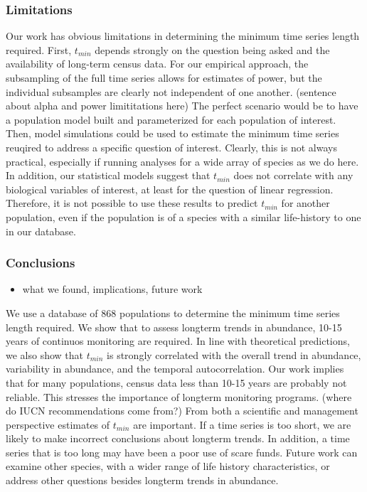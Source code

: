 \documentclass[12pt,]{article}
\providecommand{\tightlist}{%
  \setlength{\itemsep}{0pt}\setlength{\parskip}{0pt}}
\begin{document}
\subsubsection{Limitations}\label{limitations}

Our work has obvious limitations in determining the minimum time series
length required. First, \(t_{min}\) depends strongly on the question
being asked and the availability of long-term census data. For our
empirical approach, the subsampling of the full time series allows for
estimates of power, but the individual subsamples are clearly not
independent of one another. (sentence about alpha and power
limititations here) The perfect scenario would be to have a population
model built and parameterized for each population of interest. Then,
model simulations could be used to estimate the minimum time series
reuqired to address a specific question of interest. Clearly, this is
not always practical, especially if running analyses for a wide array of
species as we do here. In addition, our statistical models suggest that
\(t_{min}\) does not correlate with any biological variables of
interest, at least for the question of linear regression. Therefore, it
is not possible to use these results to predict \(t_{min}\) for another
population, even if the population is of a species with a similar
life-history to one in our database.

\subsubsection{Conclusions}\label{conclusions}

\begin{itemize}
\tightlist
\item
  what we found, implications, future work
\end{itemize}

We use a database of 868 populations to determine the minimum time
series length required. We show that to assess longterm trends in
abundance, 10-15 years of continuos monitoring are required. In line
with theoretical predictions, we also show that \(t_{min}\) is strongly
correlated with the overall trend in abundance, variability in
abundance, and the temporal autocorrelation. Our work implies that for
many populations, census data less than 10-15 years are probably not
reliable. This stresses the importance of longterm monitoring programs.
(where do IUCN recommendations come from?) From both a scientific and
management perspective estimates of \(t_{min}\) are important. If a time
series is too short, we are likely to make incorrect conclusions about
longterm trends. In addition, a time series that is too long may have
been a poor use of scare funds. Future work can examine other species,
with a wider range of life history characteristics, or address other
questions besides longterm trends in abundance.
\end{document}

